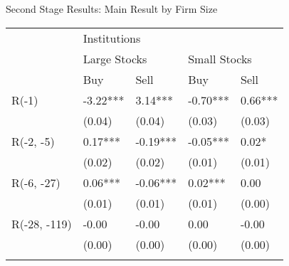 \documentclass{beamer}
\begin{document}
\begin{frame}{Second Stage Results: Main Result by Firm Size}

    {\fontsize{11}{12} \selectfont

        \begin{tabular}{l*{4}{l}}
                               & \multicolumn{4}{l}{Institutions}                                                         \\
            \cmidrule(l){2-5}

                               & \multicolumn{2}{l}{Large Stocks} & \multicolumn{2}{l}{Small Stocks}                      \\
            \cmidrule(l){2-3} \cmidrule(l){4-5}
                               & Buy                              & Sell                             & Buy      & Sell    \\
            \midrule
            R(-1)              & -3.22***                         & 3.14***                          & -0.70*** & 0.66*** \\
                               & (0.04)                           & (0.04)                           & (0.03)   & (0.03)  \\
            R(-2, -5)          & 0.17***                          & -0.19***                         & -0.05*** & 0.02*   \\
                               & (0.02)                           & (0.02)                           & (0.01)   & (0.01)  \\
            R(-6, -27)         & 0.06***                          & -0.06***                         & 0.02***  & 0.00    \\
                               & (0.01)                           & (0.01)                           & (0.01)   & (0.00)  \\
            R(-28, -119)       & -0.00                            & -0.00                            & 0.00     & -0.00   \\
                               & (0.00)                           & (0.00)                           & (0.00)   & (0.00)  \\
                               &                                  &                                  &          &         \\

\end{tabular}}
\end{frame}
\end{document}
